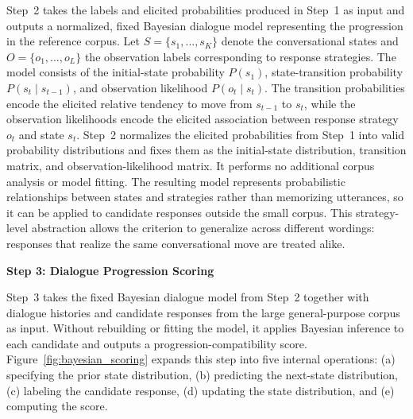 \documentclass[manuscript,review,anonymous]{acmart}
\begin{document}
Step~2 takes the labels and elicited probabilities produced in Step~1 as input and outputs a normalized, fixed Bayesian dialogue model representing the progression in the reference corpus. Let $S=\{s_1,\ldots,s_K\}$ denote the conversational states and $O=\{o_1,\ldots,o_L\}$ the observation labels corresponding to response strategies.
The model consists of the initial-state probability $P(s_1)$, state-transition probability $P(s_t\mid s_{t-1})$, and observation likelihood $P(o_t\mid s_t)$. The transition probabilities encode the elicited relative tendency to move from $s_{t-1}$ to $s_t$, while the observation likelihoods encode the elicited association between response strategy $o_t$ and state $s_t$.
Step~2 normalizes the elicited probabilities from Step~1 into valid probability distributions and fixes them as the initial-state distribution, transition matrix, and observation-likelihood matrix. It performs no additional corpus analysis or model fitting. The resulting model represents probabilistic relationships between states and strategies rather than memorizing utterances, so it can be applied to candidate responses outside the small corpus. This strategy-level abstraction allows the criterion to generalize across different wordings: responses that realize the same conversational move are treated alike.

\label{mod:scoring}
\noindent\textbf{Step 3: Dialogue Progression Scoring}\par

Step~3 takes the fixed Bayesian dialogue model from Step~2 together with dialogue histories and candidate responses from the large general-purpose corpus as input. Without rebuilding or fitting the model, it applies Bayesian inference to each candidate and outputs a progression-compatibility score. Figure~\ref{fig:bayesian_scoring} expands this step into five internal operations: (a) specifying the prior state distribution, (b) predicting the next-state distribution, (c) labeling the candidate response, (d) updating the state distribution, and (e) computing the score.
\end{document}
